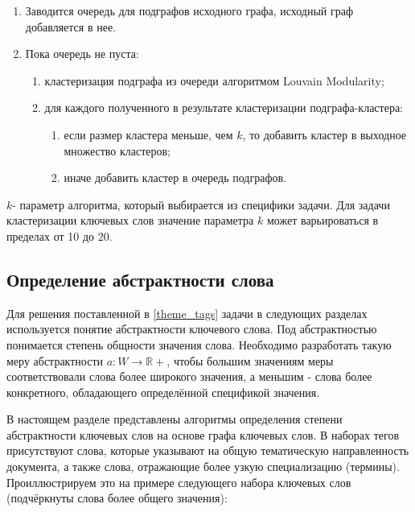 \begin{enumerate}
    \item Заводится очередь для подграфов исходного графа, исходный граф добавляется в нее.
    \item Пока очередь не пуста:
    \begin{enumerate}
        \item кластеризация подграфа из очереди алгоритмом Louvain Modularity;
        \item для каждого полученного в результате кластеризации подграфа-кластера:
            \begin{enumerate}
                \item если размер кластера меньше, чем $k$, то добавить кластер в выходное множество кластеров;
                \item иначе добавить кластер в очередь подграфов.
            \end{enumerate}
    \end{enumerate}
\end{enumerate}

$k$- параметр алгоритма, который выбирается из специфики задачи. Для задачи кластеризации ключевых слов значение параметра $k$ может варьироваться в пределах от 10 до 20.

\subsection{Определение абстрактности слова} \label{abstract_words_chapter}
Для решения поставленной в \ref{theme_tags} задачи в следующих разделах используется понятие абстрактности ключевого слова. Под абстрактностью понимается степень общности значения слова. Необходимо разработать такую меру абстрактности $a : W \rightarrow \mathbb{R}+$, чтобы большим значениям меры соответствовали слова более широкого значения, а меньшим - слова более конкретного, обладающего определённой спецификой значения.

В настоящем разделе представлены алгоритмы определения степени абстрактности ключевых слов на основе графа ключевых слов. В наборах тегов присутствуют слова, которые
указывают на общую тематическую направленность документа, а также слова, отражающие более узкую специализацию (термины). Проиллюстрируем это на примере следующего набора ключевых слов (подчёркнуты слова более общего значения):

